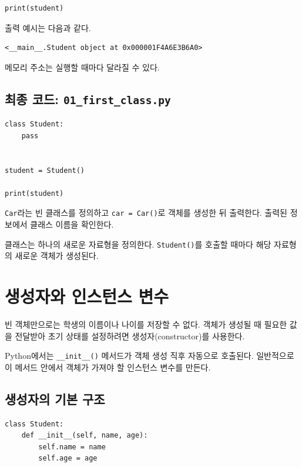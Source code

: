 \documentclass[11pt,a4paper]{article}
\begin{document}
\begin{lstlisting}
print(student)
\end{lstlisting}

출력 예시는 다음과 같다.

\begin{verbatim}
<__main__.Student object at 0x000001F4A6E3B6A0>
\end{verbatim}

메모리 주소는 실행할 때마다 달라질 수 있다.

\subsection{최종 코드: \texttt{01\_first\_class.py}}

\begin{lstlisting}
class Student:
    pass


student = Student()

print(student)
\end{lstlisting}

\begin{practicebox}
\texttt{Car}라는 빈 클래스를 정의하고 \texttt{car = Car()}로 객체를 생성한 뒤 출력한다. 출력된 정보에서 클래스 이름을 확인한다.
\end{practicebox}

\begin{importantbox}
클래스는 하나의 새로운 자료형을 정의한다. \texttt{Student()}를 호출할 때마다 해당 자료형의 새로운 객체가 생성된다.
\end{importantbox}

\section{생성자와 인스턴스 변수}

빈 객체만으로는 학생의 이름이나 나이를 저장할 수 없다. 객체가 생성될 때 필요한 값을 전달받아 초기 상태를 설정하려면 생성자(constructor)를 사용한다.

Python에서는 \texttt{\_\_init\_\_()} 메서드가 객체 생성 직후 자동으로 호출된다. 일반적으로 이 메서드 안에서 객체가 가져야 할 인스턴스 변수를 만든다.

\subsection{생성자의 기본 구조}

\begin{lstlisting}
class Student:
    def __init__(self, name, age):
        self.name = name
        self.age = age
\end{lstlisting}
\end{document}
